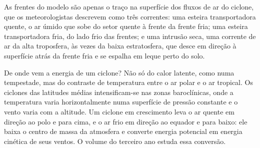\begin{omfigure}
\par{}
\end{omfigure}

As frentes do modelo são apenas o traço na superfície dos fluxos de ar do ciclone, que os
meteorologistas descrevem como três correntes: uma esteira transportadora quente, o ar úmido que sobe do
setor quente à frente da frente fria; uma esteira transportadora fria, do lado frio das frentes; e uma
intrusão seca, uma corrente de ar da alta troposfera, às vezes da baixa
estratosfera, que desce em direção à superfície atrás da frente fria e se espalha em leque perto do
solo.

De onde vem a energia de um ciclone? Não só do calor latente, como numa tempestade,
mas do contraste de temperatura entre o ar polar e o ar tropical. Os ciclones das latitudes médias
intensificam-se nas zonas baroclínicas, onde a temperatura varia horizontalmente numa superfície de
pressão constante e o vento varia com a altitude. Um ciclone em crescimento leva o ar quente em direção ao polo
e para cima, e o ar frio em direção ao equador e para baixo: ele baixa o centro de massa da
atmosfera e converte energia potencial em energia cinética de seus ventos. O volume do
terceiro ano estuda essa conversão.


